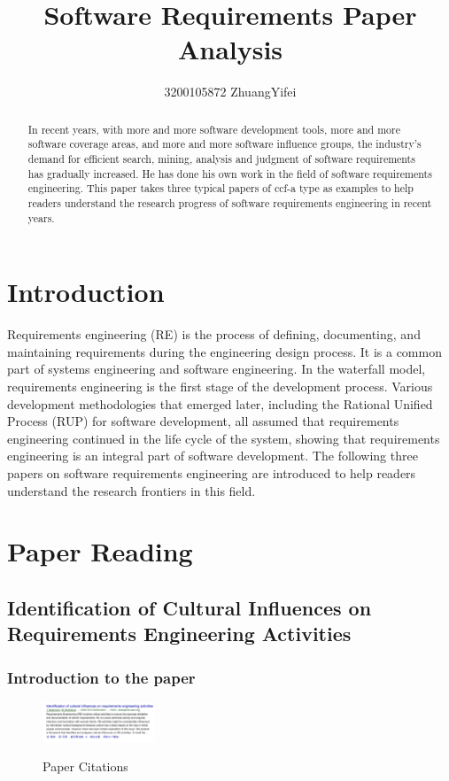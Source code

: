 \documentclass[UTF8]{IEEEtran}
\title{Software Requirements Paper Analysis}
\author{3200105872 ZhuangYifei}
\begin{document}
\maketitle

\begin{abstract}
    In recent years, with more and more software development tools, more and more software coverage areas, and more and more software influence groups, the industry's demand for efficient search, mining, analysis and judgment of software requirements has gradually increased. He has done his own work in the field of software requirements engineering. This paper takes three typical papers of ccf-a type as examples to help readers understand the research progress of software requirements engineering in recent years.\end{abstract}

\section{Introduction}

Requirements engineering (RE) is the process of defining, documenting, and maintaining requirements during the engineering design process. It is a common part of systems engineering and software engineering.
In the waterfall model, requirements engineering is the first stage of the development process. Various development methodologies that emerged later, including the Rational Unified Process (RUP) for software development, all assumed that requirements engineering continued in the life cycle of the system, showing that requirements engineering is an integral part of software development. The following three papers on software requirements engineering are introduced to help readers understand the research frontiers in this field.
\section{Paper Reading}

\subsection{Identification of Cultural Influences on Requirements Engineering Activities}
\subsubsection{Introduction to the paper} 


\begin{figure}[h]
    \centering
    \includegraphics[width=0.3\textwidth]{./img/iden.png}\\
    \caption{\label{fig:iden1}Paper Citations}
\end{figure}
\end{document}
